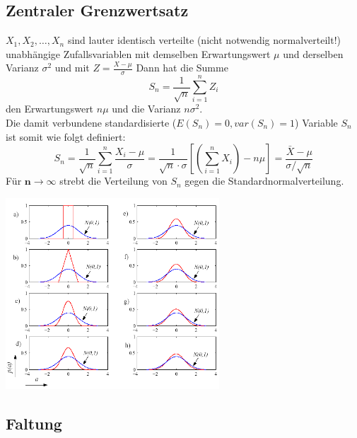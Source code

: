 	\subsection{Zentraler Grenzwertsatz}
		\begin{minipage}[]{11cm}
			$X_1, X_2, \ldots , X_n$ sind lauter identisch verteilte (nicht notwendig normalverteilt!)
			unabhängige Zufallsvariablen mit demselben Erwartungswert $\mu$ und derselben Varianz $\sigma^2$
			und mit $Z = \frac{X-\mu}{\sigma}$
		  	Dann hat die Summe
			\begin{equation}
				S_n = \frac{1}{\sqrt{n}}\sum_{i=1}^n Z_i \nonumber
			\end{equation}
			den Erwartungswert $n \mu$ und die Varianz $n \sigma^2$. \\
		  	Die damit verbundene standardisierte ($E(S_n) = 0, var(S_n) = 1$) Variable $S_n$ ist somit wie
		  	folgt definiert: \\ 
			\begin{equation}
				S_n = \frac{1}{\sqrt{n}}\sum_{i=1}^n \frac{X_i - \mu}{\sigma}
				= \frac{1}{\sqrt{n}\cdot \sigma}\left[\left(\sum\limits_{i=1}^n X_i\right) -n \mu\right]
				=\dfrac{\bar{X} - \mu}{\sigma / \sqrt{n}} \nonumber
			\end{equation}
		  	Für $\boldsymbol{n \to \infty}$ strebt die Verteilung von $S_n$ gegen die Standardnormalverteilung. \\
		  \end{minipage}
		  \begin{minipage}[]{8cm}
		  	\includegraphics[width=8cm]{./bilder/grenzwertsatz.png}
		  \end{minipage}
	  	
		\subsection{Faltung }
		
